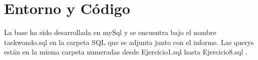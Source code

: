 \section{Entorno y Código}

La base ha sido desarrollada en mySql y se encuentra bajo el nombre taekwondo.sql en la carpeta SQL que se adjunta junto con el informe. Las querys están en la misma carpeta numeradas desde Ejercicio1.sql hasta Ejercicio8.sql . 